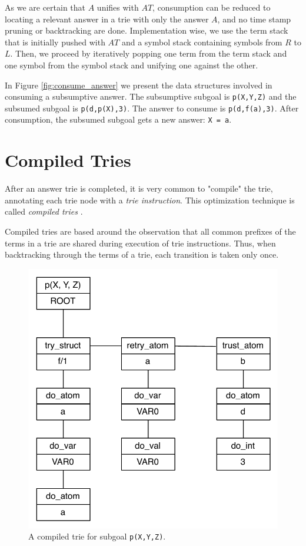 As we are certain that $A$ unifies with $AT$, consumption can be reduced to locating a relevant
answer in a trie with only the answer $A$, and no time stamp pruning or backtracking are done.
Implementation wise, we use the term stack that is initially pushed with $AT$
and a symbol stack containing symbols from $R$ to $L$. Then, we proceed by
iteratively popping one term from the term stack and one symbol from the symbol stack
and unifying one against the other.

In Figure \ref{fig:consume_answer} we present the data structures involved in consuming
a subsumptive answer. The subsumptive subgoal is \texttt{p(X,Y,Z)} and the
subsumed subgoal is \texttt{p(d,p(X),3)}. The answer to consume is \texttt{p(d,f(a),3)}.
After consumption, the subsumed subgoal gets a new answer: \texttt{X = a}.

\section{Compiled Tries}\label{sec:compiled_tries}

After an answer trie is completed, it is very common to "compile" the trie,
annotating each trie node with a \textit{trie instruction}. This optimization technique
is called \textit{compiled tries} \cite{RamakrishnanIV-99}.

Compiled tries are based around the observation that all common prefixes of the terms in a trie
are shared during execution of trie instructions. Thus, when backtracking
through the terms of a trie, each transition is taken only once.

\begin{figure}[H]
  \centering
    \includegraphics[scale=0.6]{compiled_trie.pdf}
  \caption{A compiled trie for subgoal \texttt{p(X,Y,Z)}.}
  \label{fig:compiled_trie}
\end{figure}

